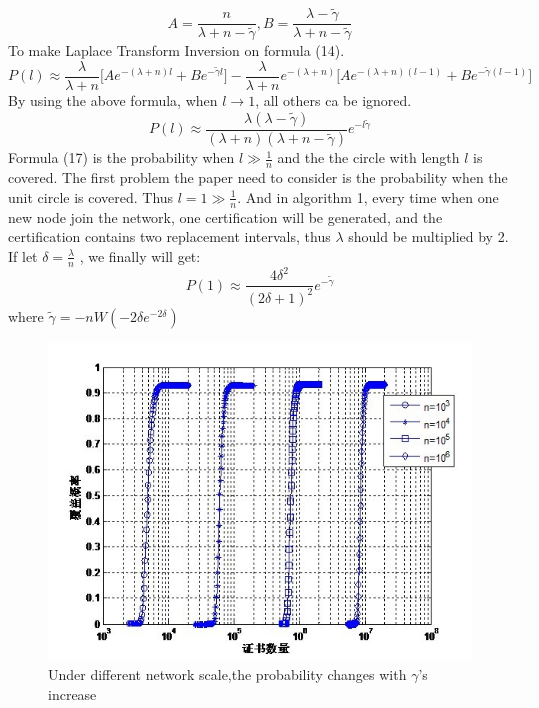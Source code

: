 \documentclass[10pt]{article}
\begin{document}
\[A=\frac{n}{\lambda +n-\widetilde{\gamma}},B=\frac{\lambda-\widetilde{\gamma}}{\lambda +n-\widetilde{\gamma}}\]
To make Laplace Transform Inversion on formula (14). 
\begin{equation}
    P(l)\approx \frac{\lambda}{\lambda+n} \lbrack Ae^{-(\lambda +n)l}+Be^{-\widetilde{\gamma}l} \rbrack-\frac{\lambda}{\lambda +n}e^{-(\lambda +n)} \lbrack Ae^{-(\lambda +n)(l-1)}+Be^{-\widetilde{\gamma}(l-1)} \rbrack
\end{equation}
By using the above formula, when $l\to 1$, all others ca be ignored.
\begin{equation}
    P(l)\approx \frac{\lambda (\lambda -\widetilde{\gamma})}{(\lambda +n)(\lambda +n-\widetilde{\gamma})}e^{-l\widetilde{\gamma}}
\end{equation}
Formula (17) is the probability when $l\gg \frac{1}{n}$ and the the circle with length $l$ is covered. The first problem the paper need to consider is the probability when the unit circle is covered. Thus $l=1\gg \frac{1}{n}$. And in algorithm 1, every time when one new node join the network,  one certification will be generated, and the certification contains two replacement intervals, thus $\lambda$ should be multiplied by 2. If let $\delta=\frac{\lambda}{n}$ , we finally will get:
\begin{equation}
    P(1)\approx \frac{4\delta^{2}}{(2\delta +1)^{2}}e^{-\widetilde{\gamma}}
\end{equation}
where $\widetilde{\gamma}=-nW(-2\delta e^{-2\delta})$
\\
\begin{figure}[htbp]
\centering
\includegraphics[bb=0 0 440 310,scale=.8]{1.jpg}
\caption{Under different network scale,the probability changes with $\gamma$'s increase}
\label{fig:f1}
\end{figure}\\
\end{document}
